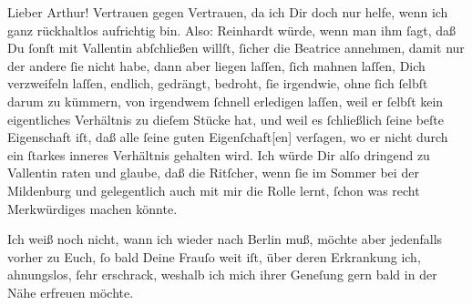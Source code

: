 \pstart\center{}Lieber Arthur!\pend\vspace{0.5em}
\pstart
           Vertrauen gegen Vertrauen, da ich Dir doch nur helfe, wenn ich ganz rückhaltlos
               aufrichtig bin. Also: Reinhardt würde, wenn
               man ihm ſagt, daß Du ſonſt mit Vallentin
               abſchließen willſt, ſicher die Beatrice
               annehmen, damit nur der andere ſie nicht habe, dann aber liegen laſſen, ſich mahnen
               laſſen, Dich verzweifeln laſſen, endlich, gedrängt, bedroht, ſie irgendwie, ohne ſich
               ſelbſt darum zu kümmern, von irgendwem ſchnell erledigen laſſen, weil er ſelbſt kein
               eigentliches Verhältnis zu dieſem Stücke hat, und weil es ſchließlich ſeine beſte
               Eigenschaft iſt, daß alle ſeine guten Eigenſchaft{[}en{]} verſagen, wo
               er {\pb}nicht durch ein ſtarkes inneres Verhältnis
               gehalten wird. Ich würde Dir alſo dringend zu Vallentin raten und glaube, daß die Ritſcher, wenn ſie im Sommer bei der Mildenburg und gelegentlich auch mit mir die Rolle lernt, ſchon was recht
               Merkwürdiges machen könnte.\pend
           
\pstart
           Ich weiß noch nicht, wann ich wieder nach Berlin
               muß, möchte aber jedenfalls vorher zu Euch, ſo bald Deine Frauſo weit iſt, über deren Erkrankung ich, ahnungslos,
               ſehr erschrack, weshalb ich mich ihrer Geneſung gern bald in der Nähe erfreuen
               möchte.\pend
           
